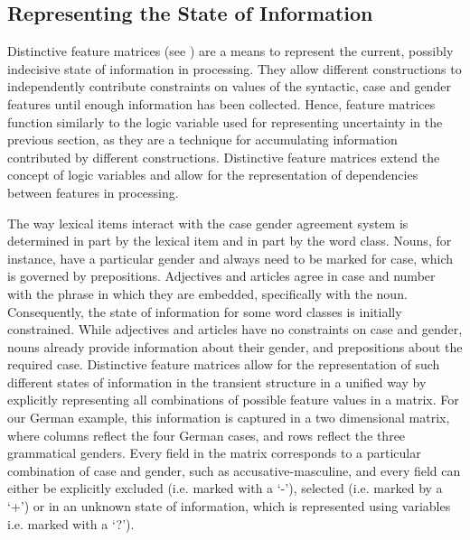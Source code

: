 \subsection*{Representing the State of Information}
Distinctive feature matrices (see \citealp{vantrijp2011matrices}) are a means to
represent the current, possibly indecisive state of information in
processing.  They allow different constructions to independently
contribute constraints on values of the syntactic, case and gender
features until enough information has been collected.  Hence, feature
matrices function similarly to the logic variable used for
representing uncertainty in the previous section, as they are a
technique for accumulating information contributed by different
constructions.  Distinctive feature matrices extend the concept of
logic variables and allow for the representation of dependencies between features
in processing.

The way lexical items interact with the case gender agreement system
is determined in part by the lexical item and in part by the word
class. Nouns, for instance, have a particular gender and always need to be marked for case,
which is governed by prepositions. Adjectives and articles
agree in case and number with the phrase in which they are embedded,
specifically with the noun. Consequently, the state of information for
some word classes is initially constrained. While adjectives and
articles have no constraints on case and gender, nouns already provide
information about their gender, and prepositions about the required
case. Distinctive feature matrices allow for the representation of such different
states of information in the transient structure in a unified way by
explicitly representing all combinations of possible feature values
in a matrix.  For our German example, this information is captured in
a two dimensional matrix, where columns reflect the four German cases,
and rows reflect the three grammatical genders. Every field in the
matrix corresponds to a particular combination of case and gender,
such as accusative-masculine, and every field can either be explicitly
excluded (i.e. marked with a `-'), selected (i.e.  marked by a `+') or
in an unknown state of information, which is represented using
variables i.e. marked with a `?').

